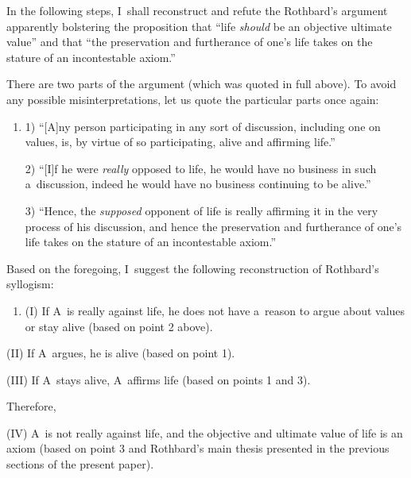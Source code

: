In the following steps, I~shall reconstruct and refute the Rothbard's argument apparently bolstering the proposition that ``life \textit{should} be an objective ultimate value'' and that ``the preservation and furtherance of one's life takes on the stature of an incontestable axiom.''



There are two parts of the argument (which was quoted in full above). To avoid any possible misinterpretations, let us quote the particular parts once again:



\begin{enumerate}

\item[] 1) ``[A]ny person participating in any sort of discussion, including one on values, is, by virtue of so participating, alive and affirming life.''



2) ``[I]f he were \textit{really} opposed to life, he would have no business in such a~discussion, indeed he would have no business continuing to be alive.''



3) ``Hence, the \textit{supposed} opponent of life is really affirming it in the very process of his discussion, and hence the preservation and furtherance of one's life takes on the stature of an incontestable axiom.''

\end{enumerate}

Based on the foregoing, I~suggest the following reconstruction of Rothbard's syllogism:



\begin{enumerate}

\item[] (I) If A~is really against life, he does not have a~reason to argue about values or stay alive (based on point 2 above).

\end{enumerate}

(II) If A~argues, he is alive (based on point 1).



(III) If A~stays alive, A~affirms life (based on points 1 and 3).



Therefore,



(IV) A~is not really against life, and the objective and ultimate value of life is an axiom (based on point 3 and Rothbard's main thesis presented in the previous sections of the present paper).



